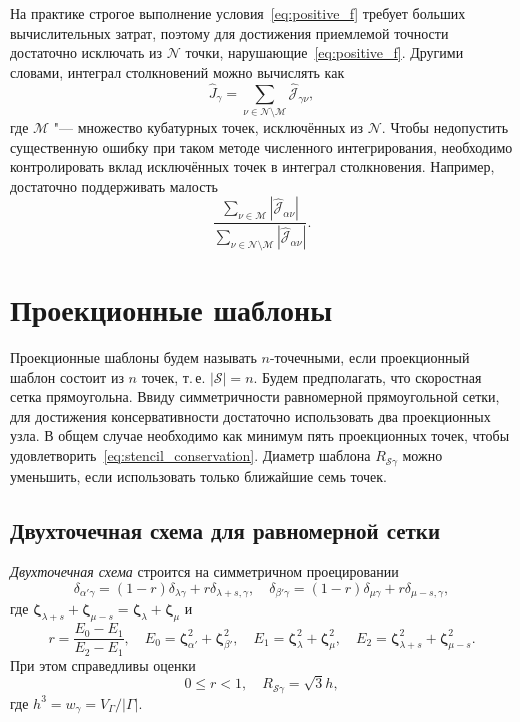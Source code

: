 \documentclass[a4paper,12pt]{article}
\newcommand{\bzeta}{\boldsymbol{\zeta}}
\newcommand{\Nu}{\mathcal{N}}
\begin{document}
На практике строгое выполнение условия~\eqref{eq:positive_f} требует больших вычислительных затрат,
поэтому для достижения приемлемой точности достаточно исключать из \(\Nu\) точки,
нарушающие~\eqref{eq:positive_f}. Другими словами, интеграл столкновений можно вычислять как
\begin{equation}\label{eq:discrete_short_ci_discarded}
    \hat{J}_\gamma = \sum_{\nu\in\Nu\setminus\mathcal{M}} \hat{\mathscr{J}}_{\gamma\nu},
\end{equation}
где \(\mathcal{M}\) "--- множество кубатурных точек, исключённых из \(\Nu\).
Чтобы недопустить существенную ошибку при таком методе численного интегрирования,
необходимо контролировать вклад исключённых точек в интеграл столкновения.
Например, достаточно поддерживать малость
\begin{equation}\label{eq:excluded_contribution}
    \frac{\sum_{\nu\in\mathcal{M}} \left| \hat{\mathscr{J}}_{\alpha\nu} \right|}
        {\sum_{\nu\in\Nu\setminus\mathcal{M}} \left| \hat{\mathscr{J}}_{\alpha\nu} \right|}.
\end{equation}

\section{Проекционные шаблоны}

Проекционные шаблоны будем называть \(n\)-точечными,
если проекционный шаблон состоит из \(n\) точек, т.\,е. \(|\mathcal{S}|=n\).
Будем предполагать, что скоростная сетка прямоугольна.
Ввиду симметричности равномерной прямоугольной сетки,
для достижения консервативности достаточно использовать два проекционных узла.
В общем случае необходимо как минимум пять проекционных точек,
чтобы удовлетворить~\eqref{eq:stencil_conservation}.
Диаметр шаблона \(R_{\mathcal{S}\gamma}\) можно уменьшить,
если использовать только ближайшие семь точек.

\subsection{Двухточечная схема для равномерной сетки}

\emph{Двухточечная схема} строится на симметричном проецировании
\begin{equation}\label{eq:uniform_projection}
    \delta_{\alpha'\gamma} = (1-r)\delta_{\lambda\gamma} + r\delta_{\lambda+s,\gamma}, \quad
    \delta_{\beta'\gamma} = (1-r)\delta_{\mu\gamma} + r\delta_{\mu-s,\gamma},
\end{equation}
где \(\bzeta_{\lambda+s} + \bzeta_{\mu-s} = \bzeta_{\lambda} + \bzeta_{\mu}\) и
\begin{equation}\label{eq:stencil_weights2}
    r = \frac{E_0-E_1}{E_2-E_1}, \quad
    E_0 = \bzeta_{\alpha'}^2 + \bzeta_{\beta'}^2, \quad
    E_1 = \bzeta_{\lambda}^2 + \bzeta_{\mu}^2, \quad
    E_2 = \bzeta_{\lambda+s}^2 + \bzeta_{\mu-s}^2.
\end{equation}
При этом справедливы оценки
\begin{equation}\label{eq:weights_ranges2}
    0 \leq r < 1, \quad R_{\mathcal{S}\gamma} = \sqrt3h,
\end{equation}
где \(h^3 = w_\gamma = V_\Gamma/|\Gamma|\).
\end{document}

